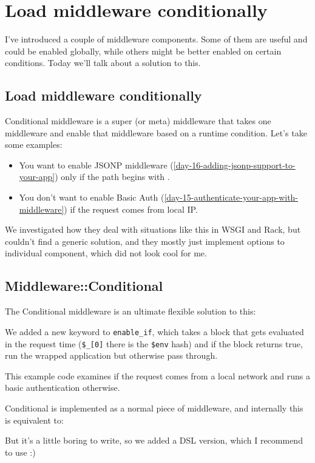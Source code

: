 \chapter{Load middleware conditionally}
\label{day-18-load-middleware-conditionally}

I've introduced a couple of middleware components. Some of them are
useful and could be enabled globally, while others might be better
enabled on certain conditions. Today we'll talk about a solution to
this.

\section{Load middleware
conditionally}\label{load-middleware-conditionally}

Conditional middleware is a super (or meta) middleware that takes one
middleware and enable that middleware based on a runtime condition.
Let's take some examples:

\begin{itemize}
\itemsep1pt\parskip0pt
\item
  You want to enable JSONP middleware (\autoref{day-16-adding-jsonp-support-to-your-app})
  only if the path begins with .
\item
  You don't want to enable Basic Auth (\autoref{day-15-authenticate-your-app-with-middleware})
  if the request comes from local IP.
\end{itemize}

We investigated how they deal with situations like this in WSGI and
Rack, but couldn't find a generic solution, and they mostly just
implement options to individual component, which did not look cool for
me.

\section{Middleware::Conditional}\label{middlewareconditional}

The Conditional middleware is an ultimate flexible solution to this:


We added a new keyword to  \lstinline!enable_if!, which
takes a block that gets evaluated in the request time (\lstinline!$_[0]!
there is the \lstinline!$env! hash) and if the block returns true, run
the wrapped application but otherwise pass through.

This example code examines if the request comes from a local network and
runs a basic authentication otherwise.

Conditional is implemented as a normal piece of middleware, and
internally this is equivalent to:


But it's a little boring to write, so we added a DSL version, which I
recommend to use :)

